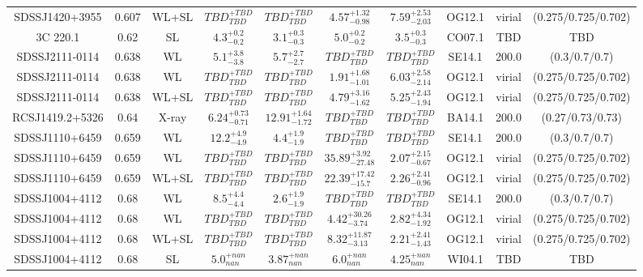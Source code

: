 \begin{table}
\begin{tabular}{cccccccccc}
SDSSJ1420+3955 & 0.607 & WL+SL & ${TBD}^{+TBD}_{TBD}$ & ${TBD}^{+TBD}_{TBD}$ & ${4.57}^{+1.32}_{-0.98}$ & ${7.59}^{+2.53}_{-2.03}$ & OG12.1 & virial & (0.275/0.725/0.702) \\
3C 220.1 & 0.62 & SL & ${4.3}^{+0.2}_{-0.2}$ & ${3.1}^{+0.3}_{-0.3}$ & ${5.0}^{+0.2}_{-0.2}$ & ${3.5}^{+0.3}_{-0.3}$ & CO07.1 & TBD & TBD \\
SDSSJ2111-0114 & 0.638 & WL & ${5.1}^{+3.8}_{-3.8}$ & ${5.7}^{+2.7}_{-2.7}$ & ${TBD}^{+TBD}_{TBD}$ & ${TBD}^{+TBD}_{TBD}$ & SE14.1 & 200.0 & (0.3/0.7/0.7) \\
SDSSJ2111-0114 & 0.638 & WL & ${TBD}^{+TBD}_{TBD}$ & ${TBD}^{+TBD}_{TBD}$ & ${1.91}^{+1.68}_{-1.01}$ & ${6.03}^{+2.58}_{-2.14}$ & OG12.1 & virial & (0.275/0.725/0.702) \\
SDSSJ2111-0114 & 0.638 & WL+SL & ${TBD}^{+TBD}_{TBD}$ & ${TBD}^{+TBD}_{TBD}$ & ${4.79}^{+3.16}_{-1.62}$ & ${5.25}^{+2.43}_{-1.94}$ & OG12.1 & virial & (0.275/0.725/0.702) \\
RCSJ1419.2+5326 & 0.64 & X-ray & ${6.24}^{+0.73}_{-0.71}$ & ${12.91}^{+1.64}_{-1.72}$ & ${TBD}^{+TBD}_{TBD}$ & ${TBD}^{+TBD}_{TBD}$ & BA14.1 & 200.0 & (0.27/0.73/0.73) \\
SDSSJ1110+6459 & 0.659 & WL & ${12.2}^{+4.9}_{-4.9}$ & ${4.4}^{+1.9}_{-1.9}$ & ${TBD}^{+TBD}_{TBD}$ & ${TBD}^{+TBD}_{TBD}$ & SE14.1 & 200.0 & (0.3/0.7/0.7) \\
SDSSJ1110+6459 & 0.659 & WL & ${TBD}^{+TBD}_{TBD}$ & ${TBD}^{+TBD}_{TBD}$ & ${35.89}^{+3.92}_{-27.48}$ & ${2.07}^{+2.15}_{-0.67}$ & OG12.1 & virial & (0.275/0.725/0.702) \\
SDSSJ1110+6459 & 0.659 & WL+SL & ${TBD}^{+TBD}_{TBD}$ & ${TBD}^{+TBD}_{TBD}$ & ${22.39}^{+17.42}_{-15.7}$ & ${2.26}^{+2.41}_{-0.96}$ & OG12.1 & virial & (0.275/0.725/0.702) \\
SDSSJ1004+4112 & 0.68 & WL & ${8.5}^{+4.4}_{-4.4}$ & ${2.6}^{+1.9}_{-1.9}$ & ${TBD}^{+TBD}_{TBD}$ & ${TBD}^{+TBD}_{TBD}$ & SE14.1 & 200.0 & (0.3/0.7/0.7) \\
SDSSJ1004+4112 & 0.68 & WL & ${TBD}^{+TBD}_{TBD}$ & ${TBD}^{+TBD}_{TBD}$ & ${4.42}^{+30.26}_{-3.74}$ & ${2.82}^{+4.34}_{-1.92}$ & OG12.1 & virial & (0.275/0.725/0.702) \\
SDSSJ1004+4112 & 0.68 & WL+SL & ${TBD}^{+TBD}_{TBD}$ & ${TBD}^{+TBD}_{TBD}$ & ${8.32}^{+11.87}_{-3.13}$ & ${2.21}^{+2.41}_{-1.43}$ & OG12.1 & virial & (0.275/0.725/0.702) \\
SDSSJ1004+4112 & 0.68 & SL & ${5.0}^{+nan}_{nan}$ & ${3.87}^{+nan}_{nan}$ & ${6.0}^{+nan}_{nan}$ & ${4.25}^{+nan}_{nan}$ & WI04.1 & TBD & TBD \\

\end{tabular}
\end{table}
